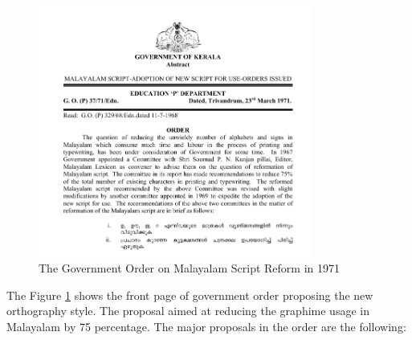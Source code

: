\documentclass[10pt]{article}
\begin{document}
\begin{figure}[h]
  \centering
   \includegraphics[width=0.8\textwidth]{images/1971-gov-script-reformation-order.png}
     \caption{The Government Order on Malayalam Script Reform in 1971}
	\label{go1971}
\end{figure}

The Figure \ref{go1971} shows the front page of government order proposing the new orthography style. The proposal aimed at reducing the graphime usage in Malayalam by 75 percentage. The major proposals in the order are the following:\cite{1971go}
\end{document}

